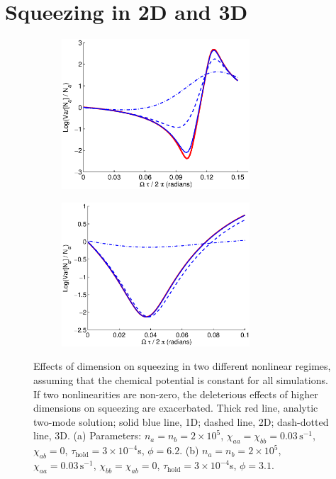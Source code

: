 \documentclass{iopart}
\begin{document}
\section{Squeezing in 2D and 3D} \label{sec:2D3Dsqueezing}

\begin{figure}
  \centering
  \begin{subfigure}{.5\textwidth}
    \centering
    \includegraphics[width=7cm]{figures/dimensional_effects_on_squeezing_1.eps}
    \label{figDimensionalSqueezingEffects:sub1}
  \end{subfigure}%
  \begin{subfigure}{.5\textwidth}
    \centering
    \includegraphics[width=7cm]{figures/dimensional_effects_on_squeezing_2.eps}
    \label{figDimensionalSqueezingEffects:sub2}
  \end{subfigure}
\caption{Effects of dimension on squeezing in two different nonlinear regimes, assuming that the chemical potential is constant for all simulations. If two nonlinearities are non-zero, the deleterious effects of higher dimensions on squeezing are exacerbated. Thick red line, analytic two-mode solution; solid blue line, 1D; dashed line, 2D; dash-dotted line, 3D. (a) Parameters: $n_a = n_b =2 \times 10^5$, $\chi_{aa}=\chi_{bb}=0.03\,\text{s}^{-1}$, $\chi_{ab}=0$, $\tau_{\mathrm{hold}}=3\times 10^{-4}$s, $\phi=6.2$. (b) $n_a = n_b =2 \times 10^5$, $\chi_{aa}=0.03\,\text{s}^{-1}$, $\chi_{bb}=\chi_{ab}=0$, $\tau_{\mathrm{hold}}=3\times 10^{-4}$s, $\phi=3.1$.}
  \label{figDimensionalSqueezingEffects}
\end{figure}
\end{document}
